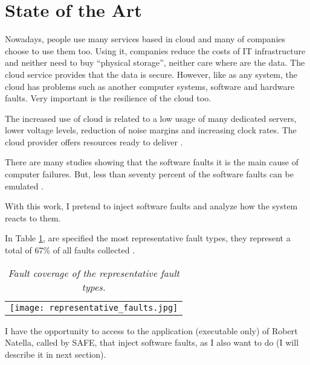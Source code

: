 \newpage
\section{State of the Art}

Nowadays, people use many services based in cloud and many of companies choose to use them too. Using it, companies reduce the costs of IT infrastructure and neither need to buy ``physical storage'', neither care where are the data. The cloud service provides that the data is secure.
However, like as any system, the cloud has problems such as another computer systems, software and hardware faults. Very important is the resilience of the cloud too.

The increased use of cloud is related to a low usage of many dedicated servers, lower voltage levels, reduction of noise margins and increasing clock rates. The cloud provider offers resources ready to deliver \cite{wolter2012resilience}.

There are many studies showing that the software faults\cite{avizzienisbasic} it is the main cause of computer failures. But, less than seventy percent of the software faults can be emulated \cite{madeira2000emulation}.

With this work, I pretend to inject software faults and analyze how the system reacts to them.

In Table \ref{tab:representative_faults}, are specified the most representative fault types, they represent a total of 67\% of all faults collected \cite{duraes2005thesis}.

\begin{table}[!ht]
\begin{tabular}{c}
\texttt{[image: representative\_faults.jpg]}
\end{tabular}
\caption{\small \sl Fault coverage of the representative fault types. \cite{duraes2005thesis} \label{tab:representative_faults}}
\end{table}





I have the opportunity to access to the application (executable only)
of Robert Natella, called by SAFE, that inject software faults, as I also want to do (I will describe it in next section).

